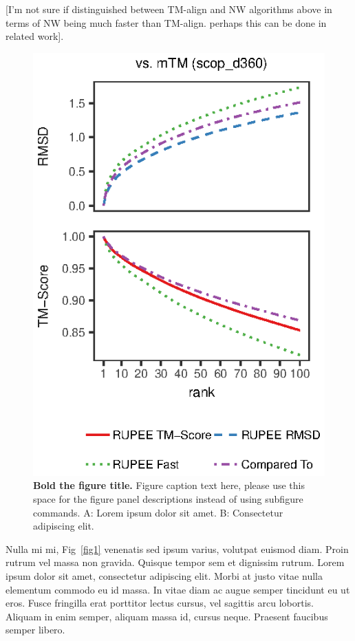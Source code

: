 \documentclass[10pt,letterpaper]{article}
\begin{document}
[I'm not sure if distinguished between TM-align and NW algorithms above in terms of NW being much faster than TM-align.
perhaps this can be done in related work].

\begin{figure}[!h]
\includegraphics{Fig5}
\caption{{\bf Bold the figure title.}
Figure caption text here, please use this space for the figure panel descriptions instead of using subfigure commands. A: Lorem ipsum dolor sit amet. B: Consectetur adipiscing elit.}
\label{fig5}
\end{figure}

Nulla mi mi, Fig~\ref{fig1} venenatis sed ipsum varius, volutpat euismod diam. Proin rutrum vel massa non gravida. Quisque tempor sem et dignissim rutrum. Lorem ipsum dolor sit amet, consectetur adipiscing elit. Morbi at justo vitae nulla elementum commodo eu id massa. In vitae diam ac augue semper tincidunt eu ut eros. Fusce fringilla erat porttitor lectus cursus,  vel sagittis arcu lobortis. Aliquam in enim semper, aliquam massa id, cursus neque. Praesent faucibus semper libero.
\end{document}
